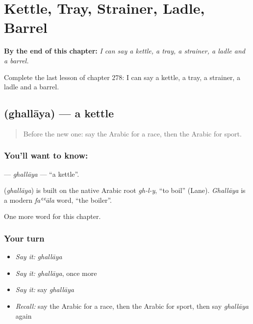 
\chapter{Kettle, Tray, Strainer, Ladle, Barrel}
\label{ch:ar-kettle-tray-strainer-ladle-barrel}

\begin{chapteropening}
\textbf{By the end of this chapter:} \emph{I can say a kettle, a tray, a strainer, a ladle and a barrel.}

Complete the last lesson of chapter 278: I can say a kettle, a tray, a strainer, a ladle and a barrel.
\end{chapteropening}

\section[\texorpdfstring{\ar{غلاية} (ghallāya)}{غلاية (ghallāya)}]{ (ghallāya) — a kettle}

\label{lesson:AR-C278-ghallaya}



\begin{quote}
Before the new one: say the Arabic for a race, then the Arabic for sport.
\end{quote}

\subsection*{You'll want to know: }
\textbf{} — \emph{ghallāya} — \textquotedblleft{}a kettle\textquotedblright{}.

\begin{cousinweb}
\textbf{} (\emph{ghallāya}) is built on the native Arabic root \emph{gh-l-y}, \textquotedblleft{}to boil\textquotedblright{} (Lane). \emph{Ghallāya} is a modern \emph{faʿʿāla} word, \textquotedblleft{}the boiler\textquotedblright{}.
\end{cousinweb}

\begin{grammarlens}[title={What you've built}]
One more word for this chapter.
\end{grammarlens}

\subsection*{Your turn}
\begin{itemize}
\raggedright
  \item \emph{Say it:} \emph{ghallāya}
  \item \emph{Say it:} \emph{ghallāya}, once more
  \item \emph{Say it:} say \emph{ghallāya}
  \item \emph{Recall:} say the Arabic for a race, then the Arabic for sport, then say \emph{ghallāya} again
\end{itemize}

